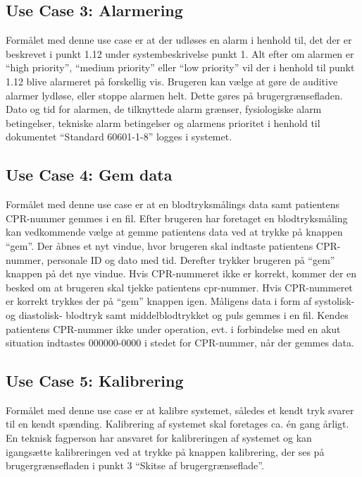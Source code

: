 \subsection{Use Case 3: Alarmering}
Formålet med denne use case er at der udløses en alarm i henhold til, det der er beskrevet i punkt 1.12 under systembeskrivelse punkt 1. Alt efter om alarmen er “high priority”, “medium priority” eller “low priority” vil der i henhold til punkt 1.12 blive alarmeret på forskellig vis. Brugeren kan vælge at gøre de auditive alarmer lydløse, eller stoppe alarmen helt. Dette gøres på brugergrænsefladen.
Dato og tid for alarmen, de tilknyttede alarm grænser, fysiologiske alarm betingelser, tekniske alarm betingelser og alarmens prioritet i henhold til dokumentet “Standard 60601-1-8” logges i systemet. 

\subsection{Use Case 4: Gem data}
Formålet med denne use case er at en blodtryksmålings data samt patientens CPR-nummer gemmes i en fil. Efter brugeren har foretaget en blodtryksmåling kan vedkommende vælge at gemme patientens data ved at trykke på knappen “gem”. Der åbnes et nyt vindue, hvor brugeren skal indtaste patientens CPR-nummer, personale ID og dato med tid. Derefter trykker brugeren på “gem” knappen på det nye vindue. Hvis CPR-nummeret ikke er korrekt, kommer der en besked om at brugeren skal tjekke patientens cpr-nummer. Hvis CPR-nummeret er korrekt trykkes der på “gem” knappen igen. Måligens data i form af systolisk- og diastolisk- blodtryk samt middelblodtrykket og puls gemmes i en fil. Kendes patientens CPR-nummer ikke under operation, evt. i forbindelse med en akut situation indtastes 000000-0000 i stedet for CPR-nummer, når der gemmes data.

\subsection{Use Case 5: Kalibrering}
Formålet med denne use case er at kalibre systemet, således et kendt tryk svarer til en kendt spænding. Kalibrering af systemet skal foretages ca. én gang årligt. En teknisk fagperson har ansvaret for kalibreringen af systemet og kan igangsætte kalibreringen ved at trykke på knappen kalibrering, der ses på brugergrænsefladen i punkt 3 “Skitse af brugergrænseflade”. 
